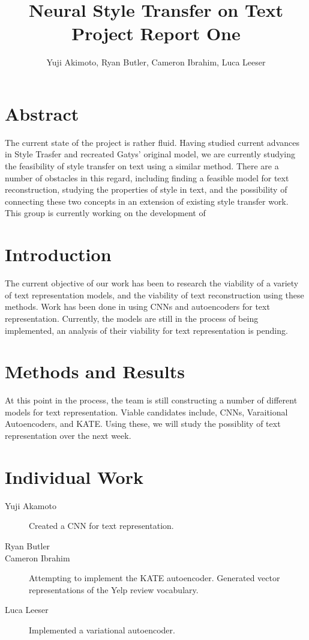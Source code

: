 \documentclass{article}
\title{Neural Style Transfer on Text\\Project Report One}
\author{Yuji Akimoto, Ryan Butler, Cameron Ibrahim, Luca Leeser}
\begin{document}
\maketitle

\section*{Abstract}

The current state of the project is rather fluid. Having studied current advances
in Style Trasfer and recreated Gatys' original model, we are currently studying
the feasibility of style transfer on text using a similar method. There are a number
of obstacles in this regard, including finding a feasible model for text reconstruction,
studying the properties of style in text, and the possibility of connecting these
two concepts in an extension of existing style transfer work. This group is currently
working on the development of 

\section{Introduction}

The current objective of our work has been to research the viability of a variety of text representation models, and the viability of text reconstruction using these methods. Work has been done in using CNNs and autoencoders for text representation. Currently,
the models are still in the process of being implemented, an analysis of their viability for text representation is pending.


\section{Methods and Results}

At this point in the process, the team is still constructing a number of different models
for text representation. Viable candidates include, CNNs, Varaitional Autoencoders, and KATE. Using these, we will study the possiblity of text representation over the next week.

\section{Individual Work}

\begin{description}

	\item [Yuji Akamoto]
		Created a CNN for text representation.

	\item [Ryan Butler]

	\item [Cameron Ibrahim]
		Attempting to implement the KATE autoencoder.
		Generated vector representations of the Yelp review vocabulary. 

	\item [Luca Leeser]
		Implemented a variational autoencoder.

\end{description}
\end{document}
